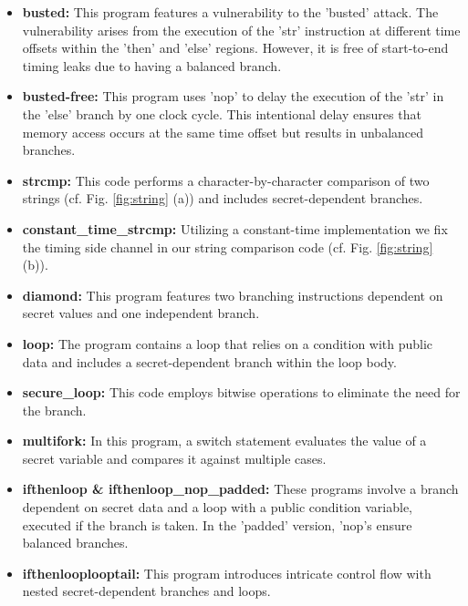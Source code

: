 \begin{itemize}
%
    \item \textbf{busted:} This program features a vulnerability to the 'busted' attack. The vulnerability arises from the execution of the 'str' instruction at different time offsets within the 'then' and 'else' regions. However, it is free of start-to-end timing leaks due to having a balanced branch.
%
    \item \textbf{busted-free:} This program uses 'nop' to
delay the execution of the 'str' in the 'else' branch by one
clock cycle. This intentional delay ensures that memory access occurs at
the same time offset but results in unbalanced branches.
%
    \item \textbf{strcmp:} This code performs a character-by-character
comparison of two strings (cf. Fig. \ref{fig:string} (a)) and includes secret-dependent branches.
%
    \item \textbf{constant\_time\_strcmp:} Utilizing a constant-time
implementation we fix the timing side channel in our string comparison code (cf. Fig. \ref{fig:string} (b)).
%
    \item \textbf{diamond:} This program features two branching instructions dependent on secret values and one independent branch.
%
    \item \textbf{loop:} The program contains a loop that relies on a condition with public data and includes a secret-dependent branch within the loop body. 
%    
    \item \textbf{secure\_loop:} This code employs bitwise operations to
eliminate the need for the branch.
%    
    \item \textbf{multifork:} In this program, a switch statement evaluates the value of a secret variable and compares it against multiple cases. 
    
    \item \textbf{ifthenloop \& ifthenloop\_nop\_padded:} These programs
involve a branch dependent on secret data and a loop with a public
condition variable, executed if the branch is taken. In the
'padded' version, 'nop's ensure balanced branches.  
%    
    \item \textbf{ifthenlooplooptail:} This program introduces intricate
control flow with nested
secret-dependent branches and loops.
%
\end{itemize}


